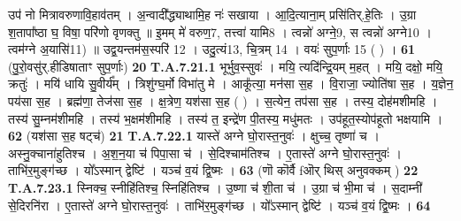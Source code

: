 \documentclass[17pt]{extarticle}
\begin{document}
                  उप॑ नो मित्रावरुणावि॒हाव॑तम् । अ॒न्वादी᳚द्ध्याथामि॒ह नः॑ सखाया । आ॒दि॒त्याना॒म् प्रसि॑तिर्.हे॒तिः । उ॒ग्रा श॒तापा᳚ष्ठा घ॒ विषा॒ परि॑णो वृणक्तु ॥  इ॒मम् मे॑ वरुण॒{7}, तत्त्वा॑ यामि{8} । त्वन्नो॑ अग्ने॒{9},  स त्वन्नो॑ अग्ने{10} । त्वम॑ग्ने अ॒यासि॑{11) ॥  उद्व॒यन्तम॑स॒स्परि॑ {12} । उदु॒त्यं{13}, चि॒त्रम् {14} ।  वयः॑ सुप॒र्णाः {15} ( ) । \textbf{ 61} \newline
                  \newline
                                                        (पु॒रो॒वसु॑र्.हीडिषाताꣳ सुप॒र्णाः) \textbf{20} \newline \newline
                                \textbf{ T.A.7.21.1} \newline
                  भूर्भुव॒स्सुवः॑ । मयि॒ त्यदि॑न्द्रि॒यम् म॒हत् । मयि॒ दक्षो॒ मयि॒ क्रतुः॑ । मयि॑ धायि सु॒वीर्य᳚म् । त्रिशु॑ग्घ॒र्मो विभा॑तु मे । आकू᳚त्या॒ मन॑सा स॒ह ।  वि॒राजा॒ ज्योति॑षा स॒ह । य॒ज्ञेन॒ पय॑सा स॒ह । ब्रह्म॑णा॒ तेज॑सा स॒ह । क्ष॒त्रेण॒ यश॑सा स॒ह ( ) । स॒त्येन॒ तप॑सा स॒ह । तस्य॒ दोह॑मशीमहि ।  तस्य॑ सु॒म्नम॑शीमहि । तस्य॑ भ॒क्षम॑शीमहि ।  तस्य॑ त॒ इन्द्रे॑ण पी॒तस्य॒ मधु॑मतः ।  उप॑हूत॒स्योप॑हूतो भक्षयामि । \textbf{ 62} \newline
                  \newline
                                                        (यश॑सा स॒ह षट्च॑) \textbf{21} \newline \newline
                                \textbf{ T.A.7.22.1} \newline
                  यास्ते॑ अग्ने घो॒रास्त॒नुवः॑ । क्षुच्च॒ तृष्णा॑ च । अस्नु॒क्चाना॑हुतिश्च । अ॒श॒न॒या च॑ पिपा॒सा च॑ । से॒दिश्चाम॑तिश्च । ए॒तास्ते॑ अग्ने घो॒रास्त॒नुवः॑ ।  ताभि॑र॒मुङ्ग॑च्छ । यो᳚ऽस्मान् द्वेष्टि॑ ।  यञ्च॑ व॒यं द्वि॒ष्मः । \textbf{ 63} \newline
                  \newline
                                                        (णॊ कॊर्वै fऒर् थिस् अनुवक्कम् ) \textbf{22} \newline \newline
                                \textbf{ T.A.7.23.1} \newline
                  स्निक्च॒ स्नीहि॑तिश्च॒ स्निहि॑तिश्च । उ॒ष्णा च॑ शी॒ता च॑ ।  उ॒ग्रा च॑ भी॒मा च॑ । स॒दाम्नी॑ से॒दिरनि॑रा । ए॒तास्ते॑ अग्ने घो॒रास्त॒नुवः॑ । ताभि॑र॒मुङ्ग॑च्छ । यो᳚ऽस्मान् द्वेष्टि॑ । यञ्च॑ व॒यं द्वि॒ष्मः । \textbf{ 64} \newline
                  \newline
}
\end{document}
